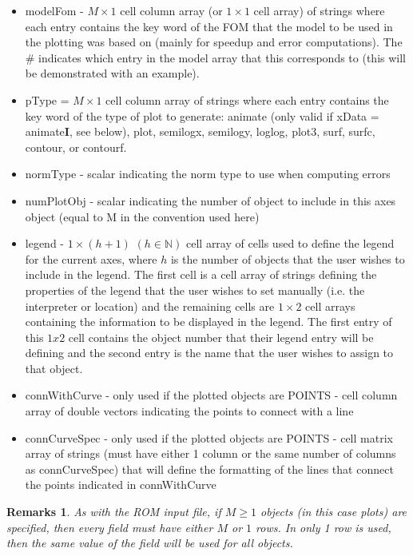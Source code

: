 \documentclass[notitlepage]{report}
\newtheorem*{Rem}{Remarks}
\newcommand{\NN}{\ensuremath{\mathbb{N} }}
\begin{document}
\begin{itemize}
      \item modelFom - $M \times 1$ cell column array (or $1 \times 1$ cell array) of strings where each entry contains the key word of the FOM that the model to be used in the plotting was based on (mainly for speedup and error computations).  The \# indicates which entry in the model array that this corresponds to (this will be demonstrated with an example).
      \item pType = $M \times 1$ cell column array of strings where each entry contains the key word of the type of plot to generate: animate (only valid if xData = animate\textbf{I}, see below), plot, semilogx, semilogy, loglog, plot3, surf, surfc, contour, or contourf.
      \item normType - scalar indicating the norm type to use when computing errors
      \item numPlotObj - scalar indicating the number of object to include in this axes object (equal to M in the convention used here)
      \item legend - $1 \times (h+1)$ $(h \in \NN)$ cell array of cells used to define the legend for the current axes, where $h$ is the number of objects that the user wishes to include in the legend.  The first cell is a cell array of strings defining the properties of the legend that the user wishes to set manually (i.e. the interpreter or location) and the remaining cells are $1 \times 2$ cell arrays containing the information to be displayed in the legend.  The first entry of this $1 x 2$ cell contains the object number that their legend entry will be defining and the second entry is the name that the user wishes to assign to that object.
      \item connWithCurve - only used if the plotted objects are POINTS - cell column array of double vectors indicating the points to connect with a line
      \item connCurveSpec - only used if the plotted objects are POINTS - cell matrix array of strings (must have either 1 column or the same number of columns as connCurveSpec) that will define the formatting of the lines that connect the points indicated in connWithCurve
\end{itemize}

\begin{Rem}
  As with the ROM input file, if $M \geq 1$ objects (in this case plots) are specified, then every field must have either $M$ or $1$ rows.  In only 1 row is used, then the same value of the field will be used for all objects.
\end{Rem}
\end{document}

